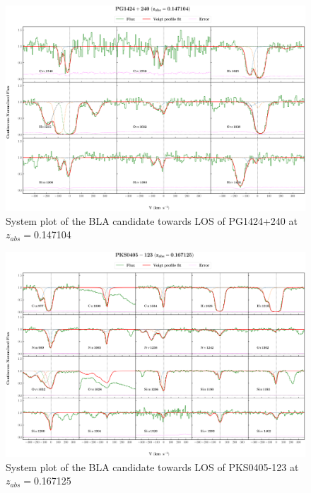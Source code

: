 \begin{landscape}
\begin{figure} 
  \centering  
  \hspace*{-21mm}
    \includegraphics[width=\linewidth]{Figures//system-plots/PG1424+240_z=0.147104_sys_plot.png} 
  \caption{System plot of the BLA candidate towards LOS of PG1424+240 at $z_{abs}=$0.147104} 
\end{figure}



\begin{figure} 
  \centering  
  \hspace*{-21mm}
    \includegraphics[width=\linewidth]{Figures//system-plots/PKS0405-123_z=0.167125_sys_plot.png} 
  \caption{System plot of the BLA candidate towards LOS of PKS0405-123 at $z_{abs}=$0.167125} 
\end{figure}




\end{landscape}
